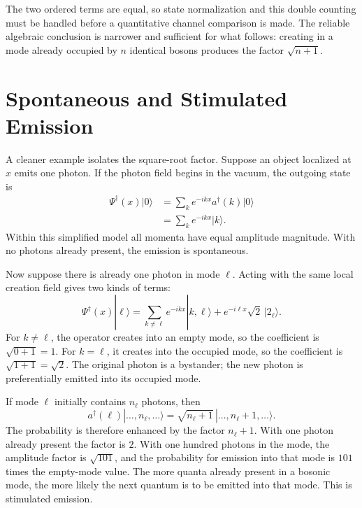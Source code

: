 The two ordered terms are equal, so state normalization and this double counting must be handled before a quantitative channel comparison is made. The reliable algebraic conclusion is narrower and sufficient for what follows: creating in a mode already occupied by \(n\) identical bosons produces the factor \(\sqrt{n+1}\).

\section{Spontaneous and Stimulated Emission}

A cleaner example isolates the square-root factor. Suppose an object localized at \(x\) emits one photon. If the photon field begins in the vacuum, the outgoing state is
\begin{align}
\Psi^\dagger(x)|0\rangle
&=\sum_k e^{-ikx}a^\dagger(k)|0\rangle\\
&=\sum_k e^{-ikx}|k\rangle.
\end{align}
Within this simplified model all momenta have equal amplitude magnitude. With no photons already present, the emission is spontaneous.

Now suppose there is already one photon in mode \(\ell\). Acting with the same local creation field gives two kinds of terms:
\begin{equation}
\Psi^\dagger(x)|\ell\rangle
=
\sum_{k\ne\ell}e^{-ikx}|k,\ell\rangle
+e^{-i\ell x}\sqrt{2}\,|2_\ell\rangle.
\end{equation}
For \(k\ne\ell\), the operator creates into an empty mode, so the coefficient is \(\sqrt{0+1}=1\). For \(k=\ell\), it creates into the occupied mode, so the coefficient is \(\sqrt{1+1}=\sqrt{2}\). The original photon is a bystander; the new photon is preferentially emitted into its occupied mode.

\begin{classroomqa}
\end{classroomqa}

If mode \(\ell\) initially contains \(n_\ell\) photons, then
\begin{equation}
a^\dagger(\ell)
|\ldots,n_\ell,\ldots\rangle
=
\sqrt{n_\ell+1}
\,|\ldots,n_\ell+1,\ldots\rangle.
\end{equation}
The probability is therefore enhanced by the factor \(n_\ell+1\). With one photon already present the factor is \(2\). With one hundred photons in the mode, the amplitude factor is \(\sqrt{101}\), and the probability for emission into that mode is \(101\) times the empty-mode value. The more quanta already present in a bosonic mode, the more likely the next quantum is to be emitted into that mode. This is stimulated emission.

